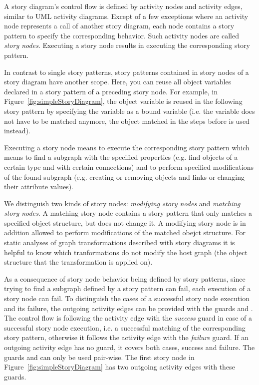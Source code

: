 A story diagram's control flow is defined by activity nodes and activity edges, similar to UML activity diagrams.
Except of a few exceptions where an activity node represents a call of another story diagram,
each node contains a story pattern to specify the corresponding behavior.
Such activity nodes are called \emph{story nodes}.
Executing a story node results in executing the corresponding story pattern.

In contrast to single story patterns, story patterns contained in story nodes of a story diagram have another scope.
Here, you can reuse all object variables declared in a story pattern of a preceding story node.
For example, in Figure~\ref{fig:simpleStoryDiagram}, the object variable  is reused in the following story pattern
by specifying the variable as a bound variable
(i.e. the variable does not have to be matched anymore, the object matched in the steps before is used instead).

Executing a story node means to execute the corresponding story pattern
which means to find a subgraph with the specified properties (e.g. find objects of a certain type and with certain connections)
and to perform specified modifications of the found subgraph (e.g. creating or removing objects and links or changing their attribute values).

We distinguish two kinds of story nodes: \emph{modifying story nodes} and \emph{matching story nodes}.
A matching story node contains a story pattern that only matches a specified object structure, but does not change it.
A modifying story node is in addition allowed to perform modifications of the matched obejct structure.
For static analyses of graph transformations described with story diagrams it is helpful to know which tranformations do not modify the host graph
(the object structure that the transformation is applied on).

As a consequence of story node behavior being defined by story patterns,
since trying to find a subgraph defined by a story pattern can fail,
each execution of a story node can fail.
To distinguish the cases of a successful story node execution and its failure,
the outgoing activity edges can be provided with the guards  and .
The control flow is following the activity edge with the \emph{success} guard in case of a successful story node execution,
i.e. a successful matching of the corresponding story pattern,
otherwise it follows the activity edge with the \emph{failure} guard.
If an outgoing activity edge has no guard, it covers both cases, success and failure.
The guards  and  can only be used pair-wise.
The first story node in Figure~\ref{fig:simpleStoryDiagram} has two outgoing activity edges with these guards.


